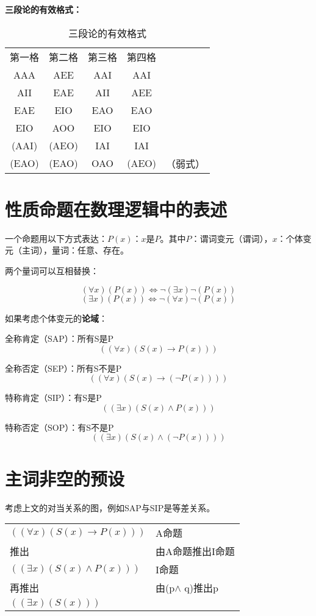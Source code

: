 \documentclass[12pt,onecolumn,a4paper]{book}
\numberwithin{table}{subsection}
\numberwithin{equation}{subsection}
\begin{document}
\textbf{三段论的有效格式：}
\begin{table}[h]
    \begin{center}
    \begin{tabular}{c:c:c:cc}
        第一格&第二格&第三格&第四格&\\
        AAA & AEE & AAI & AAI&\\
        AII & EAE & AII & AEE&\\
        EAE & EIO & EAO & EAO&\\
        EIO & AOO & EIO & EIO&\\
        (AAI) & (AEO) & IAI & IAI&\\
        (EAO) & (EAO) & OAO & (AEO)&（弱式）
    \end{tabular}
    \caption{三段论的有效格式}
\end{center}
\end{table}

\newpage

\section{性质命题在数理逻辑中的表述}\label{feikong}

一个命题用以下方式表达：$P(x)：x\text{是}P$。其中$P$：谓词变元（谓词），$x$：个体变元（主词），量词：任意、存在。

两个量词可以互相替换：

$$(\forall x)(P(x)) \Leftrightarrow \neg(\exists x)\neg(P(x))$$
$$(\exists x)(P(x)) \Leftrightarrow \neg(\forall x)\neg(P(x))$$

如果考虑个体变元的\textbf{论域}：

全称肯定（SAP）：所有S是P
$$((\forall x)(S(x)\rightarrow P(x)))$$

全称否定（SEP）：所有S不是P
$$((\forall x)(S(x)\rightarrow (\neg P(x))))$$

特称肯定（SIP）：有S是P
$$((\exists x)(S(x)\wedge P(x)))$$

特称否定（SOP）：有S不是P
$$((\exists x)(S(x)\wedge (\neg P(x))))$$

\section{主词非空的预设}
考虑上文的对当关系的图，例如SAP与SIP是等差关系。


\begin{tabular}{ll}
    $((\forall x)(S(x)\rightarrow P(x)))$& A命题\\
    推出&由A命题推出I命题\\
    $((\exists x)(S(x)\wedge P(x)))$&I命题\\
    再推出& 由(p$\wedge$ q)推出p\\
    $((\exists x)(S(x)))$&\\
\end{tabular}
\end{document}
